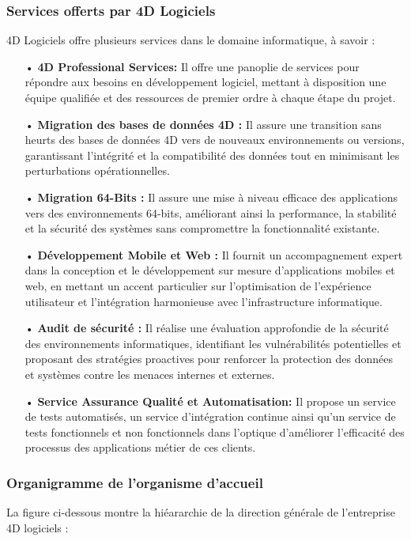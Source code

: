 \subsubsection{Services offerts par 4D Logiciels}
4D Logiciels offre plusieurs services dans le domaine informatique, à savoir :
\begin{spacing}{1.1}
    
\begin{itemize}
    \item[ • ] \textbf{4D Professional Services: } Il offre une panoplie de services pour répondre aux besoins en développement logiciel, mettant à disposition une équipe qualifiée et des ressources de premier ordre à chaque étape du projet.
    \item[ • ] \textbf{Migration des bases de données 4D :} Il assure une transition sans heurts des bases de données 4D vers de nouveaux environnements ou versions, garantissant l’intégrité et la compatibilité des données tout en minimisant les perturbations opérationnelles.
    \item[ • ] \textbf{Migration 64-Bits : } Il assure une mise à niveau efficace des applications vers des environnements 64-bits, améliorant ainsi la performance, la stabilité et la sécurité des systèmes sans compromettre la fonctionnalité existante.
    \item[ • ] \textbf{Développement Mobile et Web :} Il fournit un accompagnement expert dans la conception et le développement sur mesure d’applications mobiles et web, en mettant un accent particulier sur l’optimisation de l’expérience utilisateur et l’intégration harmonieuse avec l’infrastructure informatique.
    \item[ • ] \textbf{Audit de sécurité :} Il réalise une évaluation approfondie de la sécurité des environnements informatiques, identifiant les vulnérabilités potentielles et proposant des stratégies proactives pour renforcer la protection des données et systèmes contre les menaces internes et externes.
    \item[ • ] \textbf{Service Assurance Qualité et Automatisation:} Il propose un service de tests automatisés, un service d’intégration continue ainsi qu’un service de tests fonctionnels et non fonctionnels dans l’optique d’améliorer l’efficacité des processus des applications métier de ces clients.
\end{itemize}
\end{spacing}


\subsubsection{Organigramme de l’organisme d’accueil}
La figure ci-dessous montre la hiéararchie de la direction générale de l’entreprise 4D
logiciels :

